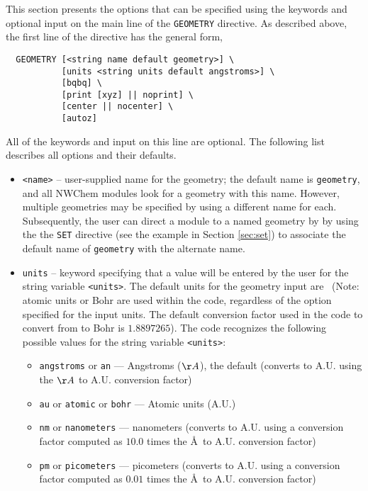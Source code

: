 This section presents the options that can be specified using the keywords 
and optional input on the main line of the {\tt GEOMETRY} directive.
As described above, the first line of the directive has the general form,
\begin{verbatim}
  GEOMETRY [<string name default geometry>] \
           [units <string units default angstroms>] \
           [bqbq] \
           [print [xyz] || noprint] \
           [center || nocenter] \
           [autoz]
\end{verbatim}
    
All of the keywords and input on this line are optional.  The following
list describes  all options and their defaults.

\begin{itemize}
\item \verb+<name>+ -- user-supplied name for the geometry; the
  default name is \verb+geometry+, and all NWChem modules look for a
  geometry with this name.  However, multiple geometries may
  be specified by using a different name for each.  Subsequently,
  the user can direct a module to a named geometry by
  by using the the \verb+SET+ directive (see
  the example in Section \ref{sec:set}) to associate the default
  name of \verb+geometry+ with the alternate name.

\item \verb+units+ -- keyword specifying that a value will be entered
  by the user for the string variable \verb+<units>+.  The default
  units for the geometry input are \angstroms\ (Note: atomic units or
  Bohr are used within the code, regardless of the option specified
  for the input units.  The default conversion factor used in the code
  to convert from {\angstroms} to Bohr is $1.8897265$).  The code
  recognizes the following possible values for the string variable
  \verb+<units>+:
\begin{itemize}
\item \verb+angstroms+ or \verb+an+ --- Angstroms ($\AA$), the default
  (converts to A.U. using the $\AA$ to A.U. conversion factor)
\item \verb+au+ or \verb+atomic+ or \verb+bohr+ --- Atomic units (A.U.)
\item \verb+nm+ or \verb+nanometers+ --- nanometers (converts to
  A.U. using a conversion factor computed as $10.0$ times the
  \AA\ to A.U. conversion factor) 
\item \verb+pm+ or \verb+picometers+ --- picometers (converts to 
  A.U. using a conversion factor computed as $0.01$ times the 
  \AA\ to A.U. conversion factor)
\end{itemize}
      

\end{itemize}
